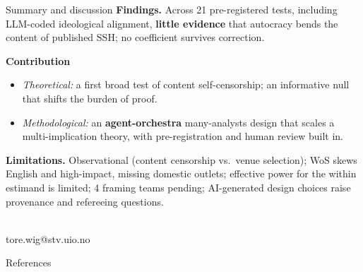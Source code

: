 \documentclass[aspectratio=169,11pt]{beamer}
\newcommand{\key}[1]{\textcolor{agentblue}{\textbf{#1}}}
\begin{document}
\begin{frame}{Summary and discussion}
  \small
  \textbf{Findings.} Across 21 pre-registered tests, including LLM-coded ideological
  alignment, \key{little evidence} that autocracy bends the content of published SSH;
  no coefficient survives correction.
  \vspace{0.3em}

  \textbf{Contribution}
  \begin{itemize}
    \item \textit{Theoretical:} a first broad test of content self-censorship; an
          informative null that shifts the burden of proof.
    \item \textit{Methodological:} an \key{agent-orchestra} many-analysts design that
          scales a multi-implication theory, with pre-registration and human review
          built in.
  \end{itemize}
  \vspace{0.2em}

  \textbf{Limitations.} Observational (content censorship vs.\ venue selection); WoS
  skews English and high-impact, missing domestic outlets; effective power for the
  within estimand is limited; 4 framing teams pending; AI-generated design choices
  raise provenance and refereeing questions.
  \vspace{0.3em}

  \centering\hyperlink{ap:toc}{}\\[0.3em]
  \color{agentblue}\small tore.wig@stv.uio.no
\end{frame}

\begin{frame}[allowframebreaks]{References}
  \footnotesize
  
  
\end{frame}

\appendix
\end{document}
